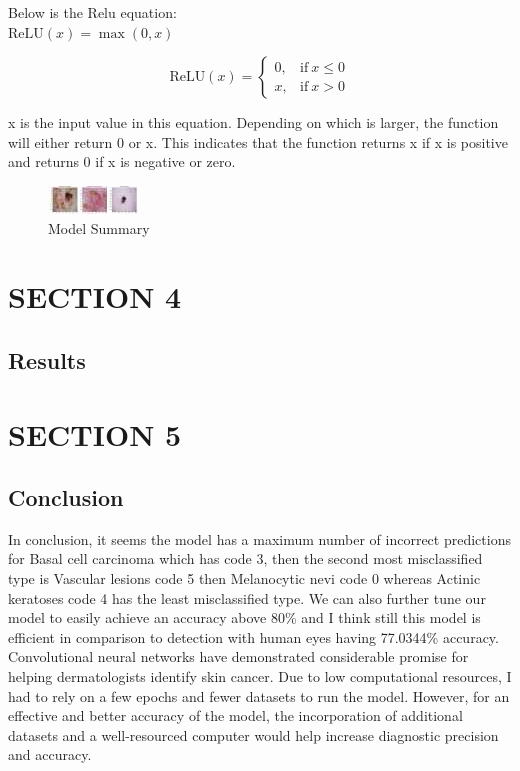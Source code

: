 \documentclass[twocolumn]{article}
\begin{document}
Below is the Relu equation:\\

\( \text{ReLU}(x) = \max(0, x) \)

\[
\text{ReLU}(x) = 
\begin{cases}
0, & \text{if}\ x \leq 0 \\
x, & \text{if}\ x > 0
\end{cases}
\]


x is the input value in this equation. Depending on which is larger, the function will either return 0 or x. This indicates that the function returns x if x is positive and returns 0 if x is negative or zero.


\begin{figure}[H]
  \centering
  \includegraphics[width=\textwidth]{derry.jpg}
  \caption{Model Summary}
  \label{fig:image}
\end{figure}
\raggedbottom

\section{SECTION 4}
\subsection{Results}



\section{SECTION 5}
\subsection{Conclusion}
In conclusion, it seems the model has a maximum number of incorrect predictions for Basal cell carcinoma which has code 3, then the second most misclassified type is Vascular lesions code 5 then Melanocytic nevi code 0 whereas Actinic keratoses code 4 has the least misclassified type.
We can also further tune our model to easily achieve an accuracy above 80\% and I think still this model is efficient in comparison to detection with human eyes having 77.0344\% accuracy.
Convolutional neural networks have demonstrated considerable promise for helping dermatologists identify skin cancer. Due to low computational resources, I had to rely on a few epochs and fewer datasets to run the model. However, for an effective and better accuracy of the model, the incorporation of additional datasets and a well-resourced computer would help increase diagnostic precision and accuracy.




\end{document}
